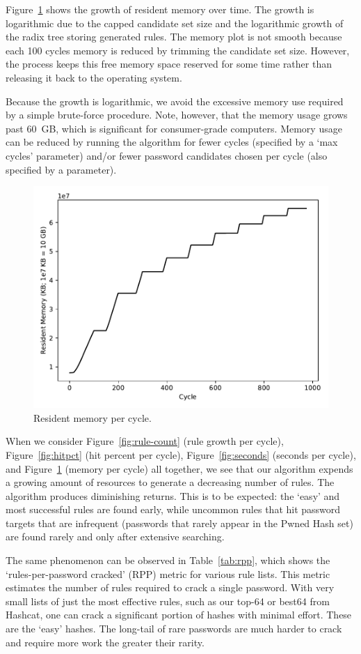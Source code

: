 \documentclass{article}
\begin{document}
Figure~\ref{fig:memory} shows the growth of resident memory over time.
The growth is logarithmic due to the capped
candidate set size and the logarithmic growth of the radix tree storing
generated rules. The memory plot is not smooth because each 100 cycles memory
is reduced by trimming the candidate set size. However, the process keeps this
free memory space reserved for some time rather than releasing it back to the
operating system.

Because the growth is logarithmic, we avoid the excessive memory use required by
a simple brute-force procedure. Note, however, that the memory usage grows past
60~GB, which is significant for consumer-grade computers. Memory usage can be
reduced by running the algorithm for fewer cycles (specified by a `max cycles'
parameter) and/or fewer password candidates chosen per cycle (also specified by
a parameter).

\begin{figure}[h!]
\centering
\includegraphics[width=0.7\linewidth]
{figures/stats-res_mem_size.pdf}
\caption{Resident memory per cycle. }
\label{fig:memory}
\end{figure}

When we consider Figure~\ref{fig:rule-count} (rule
growth per cycle), Figure~\ref{fig:hitpct} (hit percent per cycle),
Figure~\ref{fig:seconds} (seconds per cycle), and Figure~\ref{fig:memory}
(memory per cycle) all together, we see that our algorithm expends a growing
amount of resources to generate a decreasing number of rules. The algorithm
produces diminishing returns. This is to be expected: the `easy' and most
successful rules are found early, while uncommon rules that hit password
targets that are infrequent (passwords that rarely appear in the Pwned Hash
set) are found rarely and only after extensive searching.

The same phenomenon can be observed in Table~\ref{tab:rpp}, which shows the
`rules-per-password cracked' (RPP) metric for various rule lists. This metric
estimates the number of rules required to crack a single password. With very
small lists of just the most effective rules, such as our top-64 or best64 from
Hashcat, one can crack a significant portion of hashes with minimal effort.
These are the `easy' hashes. The long-tail of rare passwords are much harder to
crack and require more work the greater their rarity.
\end{document}
